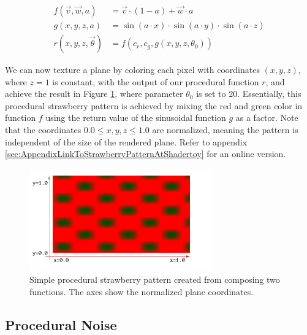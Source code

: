 \begin{equation}\label{eq:ProceduralFunctionComposition}
\begin{aligned}
    f(\vec{v}, \vec{w}, a) &= \vec{v} \cdot (1 - a) + \vec{w} \cdot a \\
    g(x,y,z,a) &= \sin(a \cdot x)\cdot \sin(a \cdot y)\cdot \sin(a \cdot z)  \\
    r(x,y,z,\vec{\theta}) &= f(c_r, c_g, g(x,y,z,\theta_0))
\end{aligned}
\end{equation}

We can now texture a plane by coloring each pixel with coordinates $(x,y,z)$, where $z=1$ is constant, with the output of our procedural function $r$, and achieve the result in Figure \ref{fig:ProceduralTextureCompositionPattern}, where parameter $\theta_0$ is set to $20$. Essentially, this procedural strawberry pattern is achieved by mixing the red and green color in function $f$ using the return value of the sinusoidal function $g$ as a factor. Note that the coordinates $0.0 \leq x,y,z \leq 1.0$ are normalized, meaning the pattern is independent of the size of the rendered plane. Refer to appendix \ref{sec:AppendixLinkToStrawberryPatternAtShadertoy} for an online version.

\begin{figure}[!h]
    \centering
    \includegraphics[width=0.7\textwidth]{img/background/Procedural Strawberry Pattern.pdf}
    \caption{Simple procedural strawberry pattern created from composing two functions. The axes show the normalized plane coordinates.}
    \label{fig:ProceduralTextureCompositionPattern}
\end{figure}


\subsection{Procedural Noise}

